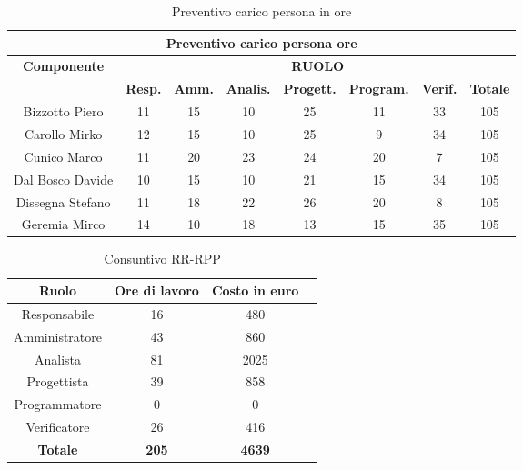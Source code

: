 \begin{table}[!h]
	\begin{center}
		  \begin{tabular}
			  {|c|c|c|c|c|c|c|c|}
		 \hline
			\multicolumn{8}{|c|}{ \textbf{Preventivo carico persona ore} } \\
			\hline
			\textbf{Componente} & \multicolumn{7}{|c|}{ \textbf{RUOLO} } \\
			\hline
			& \textbf{Resp.} & \textbf{Amm.} & \textbf{Analis.} & \textbf{Progett.} & \textbf{Program.} & \textbf{Verif.}  & \textbf{Totale}\\
			\hline
			Bizzotto Piero &  11   &  15 &  10   &   25  &  11   &  33  &  105 \\ %
			\hline
			Carollo Mirko &  12   &  15  &  10  &  25   &  9   &  34   &  105\\ %
			\hline
			Cunico Marco    &  11   &  20  &  23   &  24   &  20   &  7   &  105\\ %
			\hline
			Dal Bosco Davide        &  10   &  15   &  10   &  21   &   15  &  34  &  105\\ %
			\hline
			Dissegna Stefano        &  11  &  18   & 22  &  26   &  20  &  8  &  105\\ %
			\hline
			Geremia Mirco   &   14  &  10   &  18   &  13  &  15   &  35   &  105\\ %
			\hline		
		\end{tabular}
	\caption{Preventivo carico persona in ore} %
	\label{tab:TabellaPrevPersOre}
	\end{center}	
\end{table}

\begin{table}[h]
	\begin{center}
		  \begin{tabular}{|c|c|c|c|}
		 \hline 
		 \textbf{Ruolo} & \textbf{Ore di lavoro} & \textbf{Costo in euro}\\
		 \hline
		Responsabile & 16 & 480 \\
		Amministratore & 43 & 860\\
		Analista & 81 & 2025\\
		Progettista & 39 & 858\\
		Programmatore & 0 & 0 \\
		Verificatore & 26 & 416\\
        \hline
        \textbf{Totale} & \textbf{205} & \textbf{4639}\\
		\hline
		\end{tabular}
	\caption{Consuntivo RR-RPP} 
	\label{tab:cons_RR-RPP}
	\end{center}	
\end{table}

